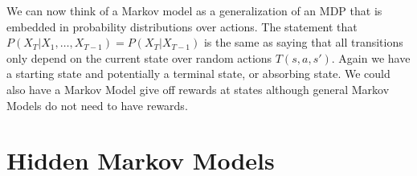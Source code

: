 \documentclass[11pt]{article}
\begin{document}
\noindent We can now think of a Markov model as a generalization of an MDP that is embedded in probability distributions over actions. The statement that $P(X_T|X_1, \ldots, X_{T-1}) = P(X_T|X_{T-1})$ is the same as saying that all transitions only depend on the current state over random actions $T(s, a, s')$. Again we have a starting state and potentially a terminal state, or absorbing state. We could also have a Markov Model give off rewards at states although general Markov Models do not need to have rewards.
\section{Hidden Markov Models}
\end{document}
